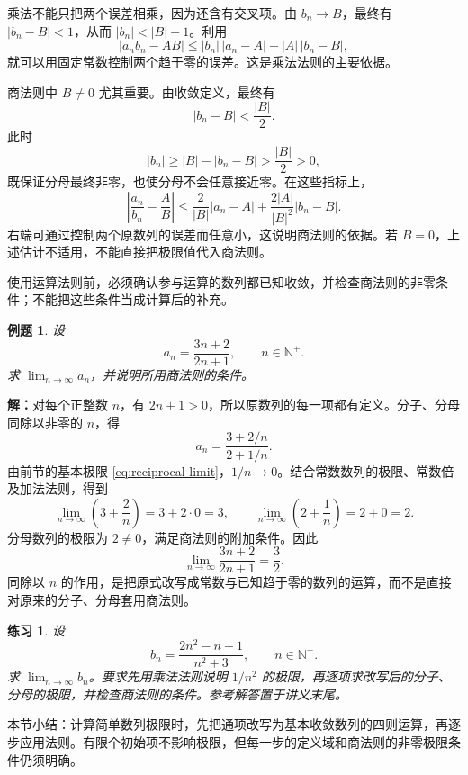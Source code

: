 \documentclass[UTF8,fontset=fandol,11pt]{ctexart}
\newtheorem{example}[definition]{例题}
\newtheorem{exercise}[definition]{练习}
\begin{document}
乘法不能只把两个误差相乘，因为还含有交叉项。由 $b_n\to B$，最终有 $|b_n-B|<1$，从而 $|b_n|<|B|+1$。利用
\[
|a_nb_n-AB|
\leq |b_n|\,|a_n-A|+|A|\,|b_n-B|,
\]
就可以用固定常数控制两个趋于零的误差。这是乘法法则的主要依据。

商法则中 $B\ne0$ 尤其重要。由收敛定义，最终有
\[
|b_n-B|<\frac{|B|}{2}.
\]
此时
\[
|b_n|\geq |B|-|b_n-B|>\frac{|B|}{2}>0,
\]
既保证分母最终非零，也使分母不会任意接近零。在这些指标上，
\[
\left|\frac{a_n}{b_n}-\frac{A}{B}\right|
\leq \frac{2}{|B|}|a_n-A|
+\frac{2|A|}{|B|^2}|b_n-B|.
\]
右端可通过控制两个原数列的误差而任意小，这说明商法则的依据。若 $B=0$，上述估计不适用，不能直接把极限值代入商法则。

使用运算法则前，必须确认参与运算的数列都已知收敛，并检查商法则的非零条件；不能把这些条件当成计算后的补充。\par
\begin{example}
设
\[
a_n=\frac{3n+2}{2n+1},\qquad n\in\mathbb{N}^+.
\]
求 $\lim_{n\to\infty}a_n$，并说明所用商法则的条件。
\end{example}
\par\noindent\textbf{解：}对每个正整数 $n$，有 $2n+1>0$，所以原数列的每一项都有定义。分子、分母同除以非零的 $n$，得
\[
a_n=\frac{3+2/n}{2+1/n}.
\]
由前节的基本极限 \eqref{eq:reciprocal-limit}，$1/n\to0$。结合常数数列的极限、常数倍及加法法则，得到
\[
\lim_{n\to\infty}\left(3+\frac{2}{n}\right)=3+2\cdot0=3,
\qquad
\lim_{n\to\infty}\left(2+\frac{1}{n}\right)=2+0=2.
\]
分母数列的极限为 $2\ne0$，满足商法则的附加条件。因此
\[
\lim_{n\to\infty}\frac{3n+2}{2n+1}=\frac{3}{2}.
\]
同除以 $n$ 的作用，是把原式改写成常数与已知趋于零的数列的运算，而不是直接对原来的分子、分母套用商法则。\par
\begin{exercise}
\label{mathagent:exercise:49ae28350c6a4abd6936597716c61d2e3cb07c4268424bce9420505d640e7b34}
设
\[
b_n=\frac{2n^2-n+1}{n^2+3},\qquad n\in\mathbb{N}^+.
\]
求 $\lim_{n\to\infty}b_n$。要求先用乘法法则说明 $1/n^2$ 的极限，再逐项求改写后的分子、分母的极限，并检查商法则的条件。参考解答置于讲义末尾。
\end{exercise}
本节小结：计算简单数列极限时，先把通项改写为基本收敛数列的四则运算，再逐步应用法则。有限个初始项不影响极限，但每一步的定义域和商法则的非零极限条件仍须明确。\par
\end{document}
